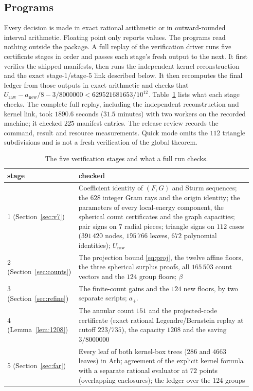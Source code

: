 \documentclass[11pt]{amsart}
\numberwithin{equation}{section}
\theoremstyle{remark}
\begin{document}
\subsection*{Programs}
Every decision is made in exact rational arithmetic or in outward-rounded interval arithmetic. Floating point only reports values. The programs read nothing outside the package. A full replay of the verification driver runs five certificate stages in order and passes each stage's fresh output to the next. It first verifies the shipped manifests, then runs the independent kernel reconstruction and the exact stage-1/stage-5 link described below. It then recomputes the final ledger from those outputs in exact arithmetic and checks that $U_{\mathrm{raw}}-a_{\mathrm{new}}/8-3/8000000<629521681653/10^{12}$. Table~\ref{tab:stages} lists what each stage checks. The complete full replay, including the independent reconstruction and kernel link, took $1890.6$ seconds ($31.5$ minutes) with two workers on the recorded machine; it checked $225$ manifest entries. The release review records the command, result and resource measurements. Quick mode omits the $112$ triangle subdivisions and is not a fresh verification of the global theorem.

\begin{table}[ht]
\caption{The five verification stages and what a full run checks.}\label{tab:stages}
\centering
\small
\begin{tabular}{lp{}}
\toprule
stage & checked \\
\midrule
1 (Section~\ref{sec:v7}) & Coefficient identity of $(F,G)$ and Sturm sequences; the $628$ integer Gram rays and the origin identity; the parameters of every local-energy component, the spherical count certificates and the graph capacities; pair signs on $7$ radial pieces; triangle signs on $112$ cases ($391\,420$ nodes, $195\,766$ leaves, $672$ polynomial identities); $U_{\mathrm{raw}}$ \\
2 (Section~\ref{sec:counts}) & The projection bound \eqref{eq:proj}, the twelve affine floors, the three spherical surplus proofs, all $165\,503$ count vectors and the $124$ group floors; $\beta$ \\
3 (Section~\ref{sec:refine}) & The finite-count gains and the $124$ new floors, by two separate scripts; $a_+$. \\
4 (Lemma~\ref{lem:1208}) & The annular count $151$ and the projected-code certificate (exact rational Legendre/Bernstein replay at cutoff $223/735$), the capacity $1208$ and the saving $3/8000000$ \\
5 (Section~\ref{sec:far}) & Every leaf of both kernel-box trees ($286$ and $4663$ leaves) in Arb; agreement of the explicit kernel formula with a separate rational evaluator at $72$ points (overlapping enclosures); the ledger over the $124$ groups \\
\bottomrule
\end{tabular}
\end{table}
\end{document}
